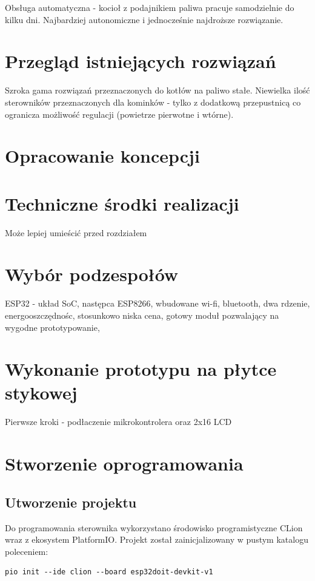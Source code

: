 \documentclass[12pt]{report}
\begin{document}
 Obsługa automatyczna - kocioł z podajnikiem paliwa pracuje samodzielnie do kilku dni. Najbardziej autonomiczne i jednocześnie najdroższe rozwiązanie.
 
 
 \chapter{Przegląd istniejących rozwiązań}
 Szroka gama rozwiązań przeznaczonych do kotłów na paliwo stałe.
 Niewielka ilość sterowników przeznaczonych dla kominków - tylko z dodatkową przepustnicą co ogranicza możliwość regulacji (powietrze pierwotne i wtórne).
  
 \chapter{Opracowanie koncepcji}
 
 \chapter{Techniczne środki realizacji}
 Może lepiej umieścić przed rozdziałem \label{rozdz.stworzenie}
 
 \chapter{Wybór podzespołów}
 ESP32 - układ SoC, następca ESP8266, wbudowane wi-fi, bluetooth, dwa rdzenie, energooszczędnośc, stosunkowo niska cena, gotowy moduł pozwalający na wygodne prototypowanie, 
 
 \chapter{Wykonanie prototypu na płytce stykowej}
 Pierwsze kroki - podłaczenie mikrokontrolera oraz 2x16 LCD
 
 \chapter{Stworzenie oprogramowania}\label{rozdz.stworzenie}
 
 \section{Utworzenie projektu}
 Do programowania sterownika wykorzystano środowisko programistyczne CLion wraz z ekosystem PlatformIO.
 Projekt został zainicjalizowany w pustym katalogu poleceniem:
 \begin{lstlisting}
pio init --ide clion --board esp32doit-devkit-v1 
 \end{lstlisting}
 
\end{document}
